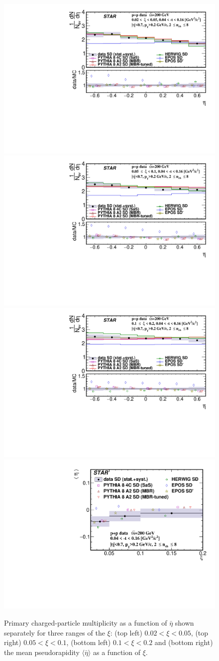 \begin{figure}[bh]
	\centering
	\includegraphics[width=.49\textwidth,page=1]{chapters/chrgSTAR/img/results/out_eta_SD_0.pdf}
	\hfill
	\includegraphics[width=.49\textwidth,page=1]{chapters/chrgSTAR/img/results/out_eta_SD_1.pdf}
	\newline
	\includegraphics[width=.49\textwidth,page=1]{chapters/chrgSTAR/img/results/out_eta_SD_2.pdf}
	\hfill
	\includegraphics[width=.49\textwidth,page=1]{chapters/chrgSTAR/img/results/mean_eta_xi.pdf}
	\caption[Primary charged-particle multiplicity as a function of $\bar{\eta}$ shown  separately for three ranges of the $\xi$ and the mean pseudorapidity  $\langle\bar{\eta}\rangle$ as a function of $\xi$.]{Primary charged-particle multiplicity as a function of $\bar{\eta}$ shown  separately for three ranges of the $\xi$: (top left) $0.02<\xi<0.05$, (top right) $0.05<\xi<0.1$, (bottom left) $0.1<\xi<0.2$ and (bottom right) the mean pseudorapidity  $\langle\bar{\eta}\rangle$ as a function of $\xi$.}
	\label{results_star_eta}
\end{figure}

